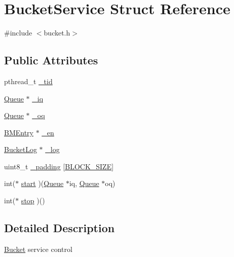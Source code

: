 \hypertarget{structBucketService}{\section{\-Bucket\-Service \-Struct \-Reference}
\label{structBucketService}
}


{\ttfamily \#include $<$bucket.\-h$>$}

\subsection*{\-Public \-Attributes}
\begin{DoxyCompactItemize}
\item 
pthread\-\_\-t \hyperlink{structBucketService_ac327842d72641c82f4c290b02fc84878}{\-\_\-tid}
\item 
\hyperlink{structQueue}{\-Queue} $\ast$ \hyperlink{structBucketService_a4428a33d4085d38626c41a657ddd778c}{\-\_\-iq}
\item 
\hyperlink{structQueue}{\-Queue} $\ast$ \hyperlink{structBucketService_a0b433c0713b4d77128a43603f0c45805}{\-\_\-oq}
\item 
\hyperlink{structBMEntry}{\-B\-M\-Entry} $\ast$ \hyperlink{structBucketService_af1cb4c78ed471459bf6b64e75d4bf96e}{\-\_\-en}
\item 
\hyperlink{structBucketLog}{\-Bucket\-Log} $\ast$ \hyperlink{structBucketService_a64edf0ca968a980121849365b3a7dea3}{\-\_\-log}
\item 
uint8\-\_\-t \hyperlink{structBucketService_a4d6a26405ae6ce5c83f9b43a550b20c8}{\-\_\-padding} \mbox{[}\hyperlink{revdedup_8h_ad51ded0bbd705f02f73fc60c0b721ced}{\-B\-L\-O\-C\-K\-\_\-\-S\-I\-Z\-E}\mbox{]}
\item 
int($\ast$ \hyperlink{structBucketService_a8325d65e9932e641e2785418d2307f8e}{start} )(\hyperlink{structQueue}{\-Queue} $\ast$iq, \hyperlink{structQueue}{\-Queue} $\ast$oq)
\item 
int($\ast$ \hyperlink{structBucketService_a4f11f738d391bcfedab49713e25d19a0}{stop} )()
\end{DoxyCompactItemize}


\subsection{\-Detailed \-Description}
\hyperlink{structBucket}{\-Bucket} service control 

